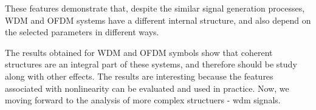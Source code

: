 These features demonstrate that, despite the similar signal generation processes, WDM and OFDM systems have a different internal structure, and also depend on the selected parameters in different ways. 

The results obtained for WDM and OFDM symbols show that coherent structures are an integral part of these systems, and therefore should be study along with other effects. The results are interesting because the features associated with nonlinearity can be evaluated and used in practice. Now, we moving forward to the analysis of more complex structuers - \gls{wdm} signals.